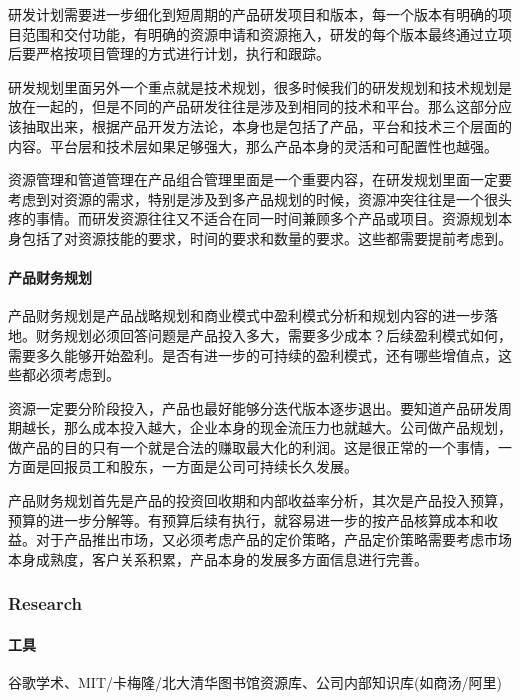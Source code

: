 \documentclass[letterpaper,11pt,english]{sphinxmanual}
\begin{document}
研发计划需要进一步细化到短周期的产品研发项目和版本，每一个版本有明确的项目范围和交付功能，有明确的资源申请和资源拖入，研发的每个版本最终通过立项后要严格按项目管理的方式进行计划，执行和跟踪。

研发规划里面另外一个重点就是技术规划，很多时候我们的研发规划和技术规划是放在一起的，但是不同的产品研发往往是涉及到相同的技术和平台。那么这部分应该抽取出来，根据产品开发方法论，本身也是包括了产品，平台和技术三个层面的内容。平台层和技术层如果足够强大，那么产品本身的灵活和可配置性也越强。

资源管理和管道管理在产品组合管理里面是一个重要内容，在研发规划里面一定要考虑到对资源的需求，特别是涉及到多产品规划的时候，资源冲突往往是一个很头疼的事情。而研发资源往往又不适合在同一时间兼顾多个产品或项目。资源规划本身包括了对资源技能的要求，时间的要求和数量的要求。这些都需要提前考虑到。


\paragraph{产品财务规划}
\label{\detokenize{chapter_knowledge/resource_manage:id3}}
产品财务规划是产品战略规划和商业模式中盈利模式分析和规划内容的进一步落地。财务规划必须回答问题是产品投入多大，需要多少成本？后续盈利模式如何，需要多久能够开始盈利。是否有进一步的可持续的盈利模式，还有哪些增值点，这些都必须考虑到。

资源一定要分阶段投入，产品也最好能够分迭代版本逐步退出。要知道产品研发周期越长，那么成本投入越大，企业本身的现金流压力也就越大。公司做产品规划，做产品的目的只有一个就是合法的赚取最大化的利润。这是很正常的一个事情，一方面是回报员工和股东，一方面是公司可持续长久发展。

产品财务规划首先是产品的投资回收期和内部收益率分析，其次是产品投入预算，预算的进一步分解等。有预算后续有执行，就容易进一步的按产品核算成本和收益。对于产品推出市场，又必须考虑产品的定价策略，产品定价策略需要考虑市场本身成熟度，客户关系积累，产品本身的发展多方面信息进行完善。


\subsubsection{Research}
\label{\detokenize{chapter_knowledge/research:research}}\label{\detokenize{chapter_knowledge/research::doc}}

\paragraph{工具}
\label{\detokenize{chapter_knowledge/research:id1}}
谷歌学术、MIT/卡梅隆/北大清华图书馆资源库、公司内部知识库(如商汤/阿里)
\end{document}

